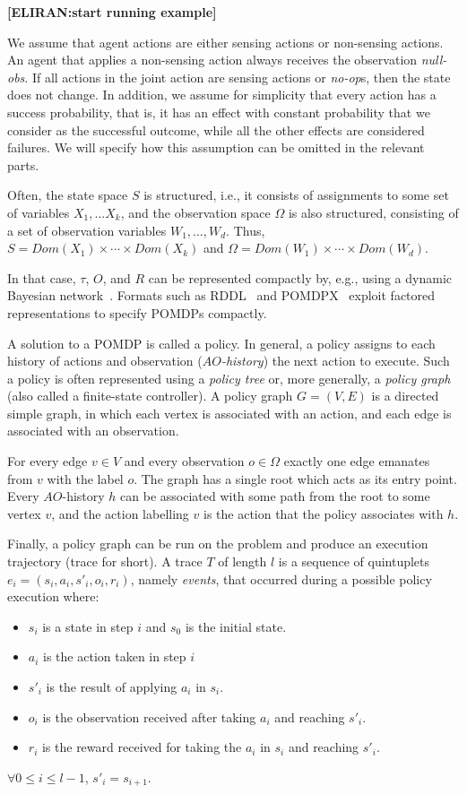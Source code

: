 \documentclass[letterpaper]{article} %
\newcommand{\eliran}[1]{\textbf{[\color{red}ELIRAN:#1]}}
\begin{document}
\eliran{start running example}


We assume that agent actions are either sensing actions or non-sensing actions. An agent that applies a non-sensing action always receives the observation {\em null-obs}. If all actions in the joint action are sensing actions or {\em no-op}s, then the state does not change. In addition, we assume for simplicity that every action has a success probability, that is, it has an effect with constant probability that we consider as the successful outcome, while all the other effects are considered failures. We will specify how this assumption can be omitted in the relevant parts.

Often, the state space $S$ is structured, i.e., it consists of assignments to some set of variables $X_1,\ldots X_k$, and the observation space $\Omega$ is
also structured, consisting of a set of observation variables $W_1,\ldots, W_d$. 
Thus, $S=Dom(X_1)\times\cdots\times Dom(X_k)$ and
$\Omega = Dom(W_1)\times\cdots\times Dom(W_d)$. 

In that case, $\tau$, $O$, and $R$ can be represented compactly by, e.g., using a dynamic Bayesian network~\cite{}. Formats such as RDDL~\cite{} and POMDPX~\cite{} exploit factored representations to specify POMDPs compactly.

A solution to a POMDP is called a policy. In general, a policy assigns to each history of actions and observation ({\em $AO$-history}) the next action to execute. 
Such a policy is often represented using a {\em policy tree} or, more generally, a {\em policy graph} (also called a finite-state controller). 
A policy graph $G=(V,E)$ is a directed simple graph, in which each vertex is associated with an action, and each edge is associated with an observation.

For every edge $v\in V$ and every observation $o\in\Omega$ exactly one edge emanates from $v$ with the label $o$.
The graph has a single root which acts as its entry point. Every $AO$-history $h$ can be associated with some path from the root to some vertex $v$,
and the action labelling $v$ is the action that the policy associates with $h$.

Finally, a policy graph can be run on the problem and produce an execution trajectory (trace for short). A trace $T$ of length $l$ is a sequence of quintuplets $e_i = (s_i, a_i, s'_i, o_i, r_i)$, namely \emph{events}, that occurred during a possible policy execution where:
\begin{itemize}
    \item $s_i$ is a state in step $i$ and $s_0$ is the initial state.
    \item $a_i$ is the action taken in step $i$
    \item $s'_i$ is the result of applying
    $a_i$ in $s_i$.
    \item $o_i$ is the observation received after taking $a_i$ and reaching $s'_i$.
    \item $r_i$ is the reward received for taking the $a_i$ in $s_i$ and reaching $s'_i$.
\end{itemize}
$\forall 0\leq i \leq l-1$, $s'_i=s_{i+1}$.
\end{document}
